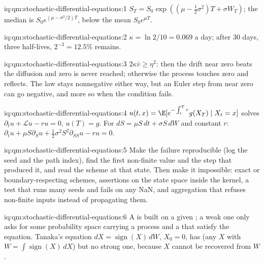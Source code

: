 \begin{solution}{iq:qm:stochastic-differential-equations:1}
$S_T = S_0\exp((\mu - \tfrac12\sigma^2)T + \sigma W_T)$; the median is $S_0e^{(\mu - \sigma^2/2)T}$, below the mean
$S_0e^{\mu T}$.
\end{solution}

\begin{solution}{iq:qm:stochastic-differential-equations:2}
$\kappa = \ln 2/10 = 0.069$ a day; after 30 days, three half-lives, $2^{-3} = 12.5\%$ remains.
\end{solution}

\begin{solution}{iq:qm:stochastic-differential-equations:3}
$2\kappa\bar v \ge \eta^2$: then the drift near zero beats the diffusion and zero is never reached;
otherwise the process touches zero and reflects. The law stays nonnegative either way, but an Euler
step from near zero can go negative, and more so when the condition fails.
\end{solution}

\begin{solution}{iq:qm:stochastic-differential-equations:4}
$u(t,x) = \E[e^{-\int_t^Tr}g(X_T) \mid X_t = x]$ solves $\partial_tu + \mathcal Lu - ru = 0$, $u(T) = g$. For
$dS = \mu S\,dt + \sigma S\,dW$ and constant $r$: $\partial_tu + \mu S\partial_Su + \tfrac12\sigma^2S^2\partial_{SS}u - ru = 0$.
\end{solution}

\begin{solution}{iq:qm:stochastic-differential-equations:5}
Make the failure reproducible (log the seed and the path index), find the first non-finite value
and the step that produced it, and read the scheme at that state. Then make it impossible: exact or
boundary-respecting schemes, assertions on the state space inside the kernel, a test that runs many
seeds and fails on any NaN, and aggregation that refuses non-finite inputs instead of propagating
them.
\end{solution}

\begin{solution}{iq:qm:stochastic-differential-equations:6}
A  is built on a given ; a weak one only asks for some probability
space carrying a process and a  that satisfy the equation. Tanaka's equation $dX =
\operatorname{sign}(X)\,dW$, $X_0 = 0$, has  (any  $X$ with $W = \int\operatorname{sign}(X)\,dX$)
but no strong one, because $X$ cannot be recovered from $W$.
\end{solution}

